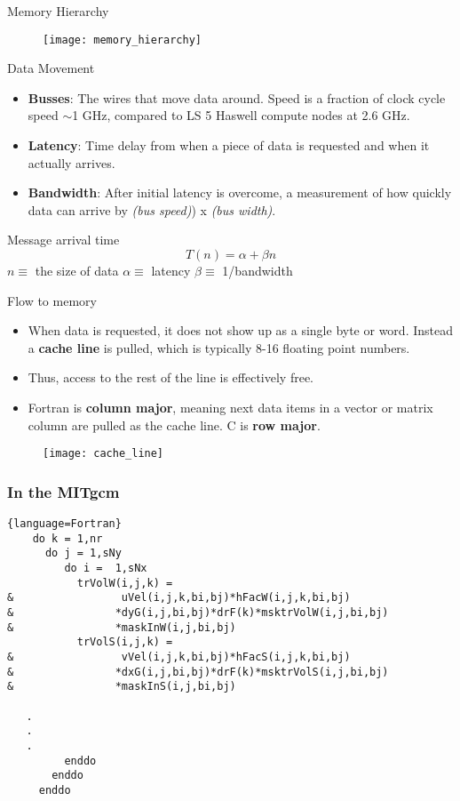 \documentclass[pdf]{beamer}
\begin{document}
 \begin{frame}{Memory Hierarchy}
  \begin{figure}
  \centering
  \texttt{[image: memory\_hierarchy]}
  \end{figure}
 \end{frame}

 \begin{frame}{Data Movement}
  \begin{itemize}
	\item \textbf{Busses}: The wires that move data around. Speed is a fraction of clock cycle speed $\sim$1 GHz, compared to LS 5 Haswell compute nodes at 2.6 GHz.
	\item \textbf{Latency}: Time delay from when a piece of data is requested and when it actually arrives. 
	\item \textbf{Bandwidth}: After initial latency is overcome, a measurement of how quickly data can arrive by \textit{(bus speed)}) x \textit{(bus width)}.
  \end{itemize}
  \begin{block}{Message arrival time}
	\begin{equation}
	  T(n) = \alpha + \beta n
	\end{equation}
	$n \equiv$ the size of data
	$\alpha \equiv$ latency
	$\beta \equiv$ 1/bandwidth
  \end{block}
 \end{frame}

 \begin{frame}{Flow to memory}
  \begin{itemize}
	\item When data is requested, it does not show up as a single byte or word. Instead a \textbf{cache line} is pulled, which is typically 8-16 floating point numbers. 
	\item Thus, access to the rest of the line is effectively free.
	\item Fortran is \textbf{column major}, meaning next data items in a vector or matrix column are pulled as the cache line. C is \textbf{row major}. 
  \end{itemize}
  \begin{figure}
  \centering
  \texttt{[image: cache\_line]}
  \end{figure}
 \end{frame}

 \begin{frame}[fragile,shrink=10]  
  \frametitle{In the MITgcm}
  \begin{lstlisting}{language=Fortran}
    do k = 1,nr
      do j = 1,sNy
         do i =  1,sNx
           trVolW(i,j,k) =
&                 uVel(i,j,k,bi,bj)*hFacW(i,j,k,bi,bj)
&                *dyG(i,j,bi,bj)*drF(k)*msktrVolW(i,j,bi,bj)
&                *maskInW(i,j,bi,bj)
           trVolS(i,j,k) =
&                 vVel(i,j,k,bi,bj)*hFacS(i,j,k,bi,bj)
&                *dxG(i,j,bi,bj)*drF(k)*msktrVolS(i,j,bi,bj)
&                *maskInS(i,j,bi,bj)

   .
   .	
   .
         enddo
       enddo
     enddo
  \end{lstlisting}
\end{frame}
\end{document}
